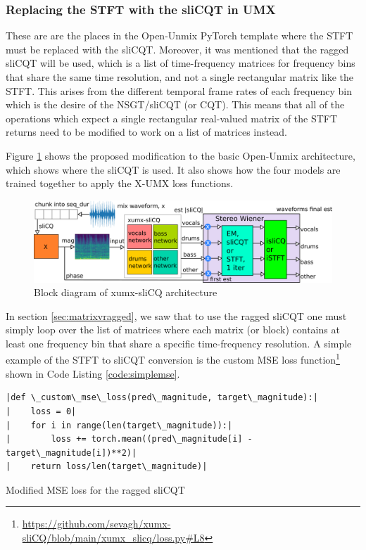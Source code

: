 \documentclass[report.tex]{subfiles}
\begin{document}
\subsubsection{Replacing the STFT with the sliCQT in UMX}
\label{sec:replacestft}


These are are the places in the Open-Unmix PyTorch template where the STFT must be replaced with the sliCQT. Moreover, it was mentioned that the ragged sliCQT will be used, which is a list of time-frequency matrices for frequency bins that share the same time resolution, and not a single rectangular matrix like the STFT. This arises from the different temporal frame rates of each frequency bin which is the desire of the NSGT/sliCQT (or CQT). This means that all of the operations which expect a single rectangular real-valued matrix of the STFT returns need to be modified to work on a list of matrices instead.

Figure \ref{fig:xumxslicq} shows the proposed modification to the basic Open-Unmix architecture, which shows where the sliCQT is used. It also shows how the four models are trained together to apply the X-UMX loss functions.

\begin{figure}[ht]
	\centering
	\includegraphics[width=\textwidth]{./images-blockdiagrams/xumx_slicq_system_compressed_largefont.png}
	\caption{Block diagram of xumx-sliCQ architecture}
	\label{fig:xumxslicq}
\end{figure}

In section \ref{sec:matrixvragged}, we saw that to use the ragged sliCQT one must simply loop over the list of matrices where each matrix (or block) contains at least one frequency bin that share a specific time-frequency resolution. A simple example of the STFT to sliCQT conversion is the custom MSE loss function\footnote{\url{https://github.com/sevagh/xumx-sliCQ/blob/main/xumx_slicq/loss.py\#L8}} shown in Code Listing \ref{code:simplemse}.

\begin{listing}[h]
  \centering
\begin{verbatim}
|def \_custom\_mse\_loss(pred\_magnitude, target\_magnitude):|
|    loss = 0|
|    for i in range(len(target\_magnitude)):|
|        loss += torch.mean((pred\_magnitude[i] - target\_magnitude[i])**2)|
|    return loss/len(target\_magnitude)|
\end{verbatim}
  \caption{Modified MSE loss for the ragged sliCQT}
  \label{code:simplemse}
\end{listing}
\end{document}
